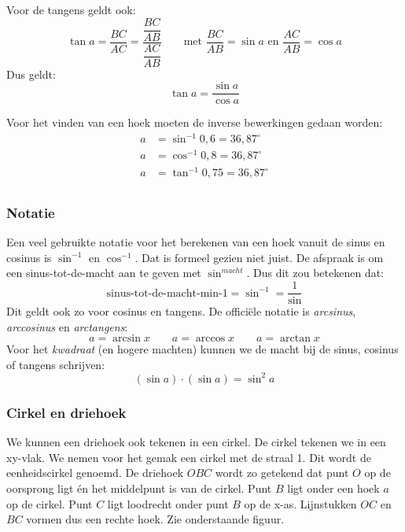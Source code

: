 \documentclass[12pt,fleqn]{article}
\begin{document}
Voor de tangens geldt ook:
\begin{equation}
\tan a = \dfrac{BC}{AC} = \dfrac{\dfrac{BC}{AB}}{\dfrac{AC}{AB}} \qquad\text{met }\dfrac{BC}{AB}=\sin a\text{ en }\dfrac{AC}{AB} = \cos a
\end{equation}
%
Dus geldt:
%
\begin{equation}
\boxed{\tan a = \dfrac{\sin a}{\cos a}}
\end{equation}

Voor het vinden van een hoek moeten de inverse bewerkingen gedaan worden:
\begin{equation}
\begin{split}
a &= \sin^{-1} 0,6 = 36,87^{\circ} \\
a &= \cos^{-1} 0,8 = 36,87^{\circ} \\
a &= \tan^{-1} 0,75 = 36,87^{\circ} \\
\end{split}
\end{equation}

\subsubsection*{Notatie}
Een veel gebruikte notatie voor het berekenen van een hoek vanuit de sinus en cosinus is $\sin^{-1}$ en $\cos^{-1}$.
Dat is formeel gezien niet juist. De afspraak is om een sinus-tot-de-macht aan te geven met $\sin^{macht}$. Dus dit zou betekenen dat:
%
\begin{equation}
\text{sinus-tot-de-macht-min-1} = \sin^{-1} = \dfrac{1}{\sin}
\end{equation}
%
Dit geldt ook zo voor cosinus en tangens. De officiële notatie is \textsl{arcsinus}, \textsl{arccosinus} en \textsl{arctangens}:
%
\begin{equation}
a = \arcsin x \qquad a = \arccos x \qquad a = \arctan x
\end{equation}
%
Voor het \textsl{kwadraat} (en hogere machten) kunnen we de macht bij de sinus, cosinus of tangens schrijven:
%
\begin{equation}
\boxed{(\sin a)\cdot(\sin a) = \sin^2 a}
\end{equation}

\subsubsection*{Cirkel en driehoek}
We kunnen een driehoek ook tekenen in een cirkel. De cirkel tekenen we in een xy-vlak. We nemen voor het gemak een cirkel met de straal 1. Dit wordt de eenheidscirkel genoemd. De driehoek $OBC$ wordt zo getekend dat punt $O$ op de oorsprong ligt én het middelpunt is van de cirkel. Punt $B$ ligt onder een hoek $a$ op de cirkel. Punt $C$ ligt loodrecht onder punt $B$ op de x-as. Lijnstukken $OC$ en $BC$ vormen dus een rechte hoek. Zie onderstaande figuur.
\end{document}
